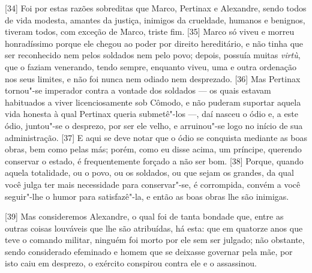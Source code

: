 {[}34{]} Foi por estas razões sobreditas que Marco, Pertinax e
Alexandre, sendo todos de vida modesta, amantes da justiça, inimigos da
crueldade, humanos e benignos, tiveram todos, com exceção de Marco,
triste fim. {[}35{]} Marco só viveu e morreu honradíssimo porque ele
chegou ao poder por direito hereditário, e não tinha que ser reconhecido
nem pelos soldados nem pelo povo; depois, possuía muitas \emph{virtù},
que o faziam venerando, tendo sempre, enquanto viveu, uma e outra
ordenação nos seus limites, e não foi nunca
nem odiado nem desprezado. {[}36{]} Mas Pertinax tornou"-se imperador
contra a vontade dos soldados --- os quais estavam habituados a viver
licenciosamente sob Cômodo, e não puderam suportar aquela vida honesta à
qual Pertinax queria submetê"-los ---, daí nasceu o ódio e, a este ódio,
juntou"-se o desprezo, por ser ele velho, e arruinou"-se logo no início de
sua administração. {[}37{]} E aqui se deve notar que o ódio se conquista
mediante as boas obras, bem como pelas más; porém, como eu disse acima,
um príncipe, querendo conservar o estado, é frequentemente forçado a não
ser bom. {[}38{]} Porque, quando aquela totalidade, ou o povo, ou os
soldados, ou que sejam os grandes, da qual você julga ter mais
necessidade para conservar"-se, é corrompida, convém a você seguir"-lhe o
humor para satisfazê"-la, e então as boas obras lhe são inimigas.

{[}39{]} Mas consideremos Alexandre, o qual foi de tanta bondade que,
entre as outras coisas louváveis que lhe são atribuídas, há esta: que em
quatorze anos que teve o comando militar, ninguém foi morto por ele sem
ser julgado; não obstante, sendo considerado efeminado e homem que se
deixasse governar pela mãe,
por isto caiu em desprezo, o exército conspirou contra ele e o
assassinou.


